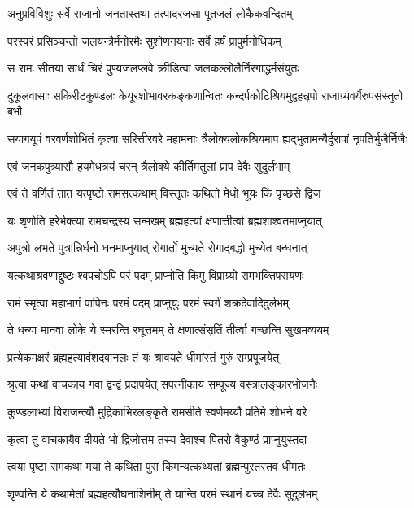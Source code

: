 \twolineshloka
{अनुप्रविविशुः सर्वे राजानो जनतास्तथा}
{तत्पादरजसा पूतजलं लोकैकवन्दितम्}%

\twolineshloka
{परस्परं प्रसिञ्चन्तो जलयन्त्रैर्मनोरमैः}
{सुशोणनयनाः सर्वे हर्षं प्रापुर्मनोधिकम्}%

\twolineshloka
{स रामः सीतया सार्धं चिरं पुण्यजलप्लवे}
{क्रीडित्वा जलकल्लोलैर्निरगाद्धर्मसंयुतः}%

\twolineshloka
{दुकूलवासाः सकिरीटकुण्डलः केयूरशोभावरकङ्कणान्वितः}
{कन्दर्पकोटिश्रियमुद्वहन्नृपो राजाग्र्यवर्यैरुपसंस्तुतो बभौ}%

\twolineshloka
{सयागयूपं वरवर्णशोभितं कृत्वा सरित्तीरवरे महामनाः}
{त्रैलोक्यलोकश्रियमाप ह्यद्भुतामन्यैर्दुरापां नृपतिर्भुजैर्निजैः}%

\twolineshloka
{एवं जनकपुत्र्यासौ हयमेधत्रयं चरन्}
{त्रैलोक्ये कीर्तिमतुलां प्राप देवैः सुदुर्लभाम्}%

\twolineshloka
{एवं ते वर्णितं तात यत्पृष्टो रामसत्कथाम्}
{विस्तृतः कथितो मेधो भूयः किं पृच्छसे द्विज}%

\twolineshloka
{यः शृणोति हरेर्भक्त्या रामचन्द्रस्य सन्मखम्}
{ब्रह्महत्यां क्षणात्तीर्त्वा ब्रह्मशाश्वतमाप्नुयात्}%

\twolineshloka
{अपुत्रो लभते पुत्रान्निर्धनो धनमाप्नुयात्}
{रोगार्तो मुच्यते रोगाद्बद्धो मुच्येत बन्धनात्}%

\twolineshloka
{यत्कथाश्रवणाद्दुष्टः श्वपचोऽपि परं पदम्}
{प्राप्नोति किमु विप्राग्र्यो रामभक्तिपरायणः}%

\twolineshloka
{रामं स्मृत्वा महाभागं पापिनः परमं पदम्}
{प्राप्नुयुः परमं स्वर्गं शक्रदेवादिदुर्लभम्}%

\twolineshloka
{ते धन्या मानवा लोके ये स्मरन्ति रघूत्तमम्}
{ते क्षणात्संसृतिं तीर्त्वा गच्छन्ति सुखमव्ययम्}%

\twolineshloka
{प्रत्येकमक्षरं ब्रह्महत्यावंशदवानलः}
{तं यः श्रावयते धीमांस्तं गुरुं सम्प्रपूजयेत्}%

\twolineshloka
{श्रुत्वा कथां वाचकाय गवां द्वन्द्वं प्रदापयेत्}
{सपत्नीकाय सम्पूज्य वस्त्रालङ्कारभोजनैः}%

\twolineshloka
{कुण्डलाभ्यां विराजन्त्यौ मुद्रिकाभिरलङ्कृते}
{रामसीते स्वर्णमय्यौ प्रतिमे शोभने वरे}%

\twolineshloka
{कृत्वा तु वाचकायैव दीयते भो द्विजोत्तम}
{तस्य देवाश्च पितरो वैकुण्ठं प्राप्नुयुस्तदा}%

\twolineshloka
{त्वया पृष्टा रामकथा मया ते कथिता पुरा}
{किमन्यत्कथ्यतां ब्रह्मन्पुरतस्तव धीमतः}%

\twolineshloka
{शृण्वन्ति ये कथामेतां ब्रह्महत्यौघनाशिनीम्}
{ते यान्ति परमं स्थानं यच्च देवैः सुदुर्लभम्}%

